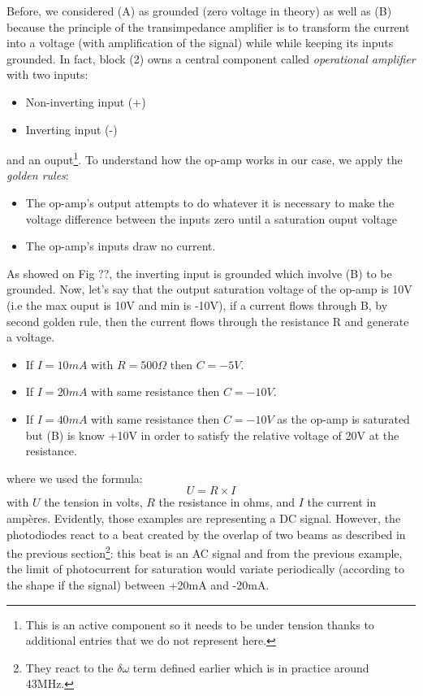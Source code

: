 \documentclass[12pt]{report}
\begin{document}
Before, we considered (A) as grounded (zero voltage in theory) as well as (B) because the principle of the transimpedance amplifier is to transform the current into a voltage (with amplification of the signal) while while keeping its inputs grounded. In fact, block (2) owns a central component called \textit{operational amplifier} with two inputs:
\begin{itemize}
 \item Non-inverting input (+)
 \item Inverting input (-)
\end{itemize}
and an ouput\footnote{This is an active component so it needs to be under tension thanks to additional entries that we do not represent here.}. To understand how the op-amp works in our case, we apply the \textit{golden rules}:
\begin{itemize}
 \item The op-amp's output attempts to do whatever it is necessary to make the voltage difference between the inputs zero until a saturation ouput voltage
 \item The op-amp's inputs draw no current.
\end{itemize} As showed on Fig ??, the inverting input is grounded which involve (B) to be grounded. Now, let's say that the output saturation voltage of the op-amp is 10V (i.e the max ouput is 10V and min is -10V), if a current flows through B, by second golden rule, then the current flows through the resistance R and generate a voltage.
\begin{itemize}
	\item If $I = 10mA$ with $R = 500\Omega$ then $C = -5V$.
	\item If $I = 20mA$ with same resistance then $C = -10V$.
	\item If $I = 40mA$ with same resistance then $C = -10V$ as the op-amp is saturated but (B) is know +10V in order to satisfy the relative voltage of 20V at the resistance.
\end{itemize}
where we used the formula:
\begin{equation}
\label{ueqri}
U = R \times I
\end{equation}
with $U$ the tension in volts, $R$ the resistance in ohms, and $I$ the current in ampères. Evidently, those examples are representing a DC signal. However, the photodiodes react to a beat created by the overlap of two beams as described in the previous section\footnote{They react to the $\delta\omega$ term defined earlier which is in practice around 43MHz.}: this beat is an AC signal and from the previous example, the limit of photocurrent for saturation would variate periodically (according to the shape if the signal) between +20mA and -20mA.
\end{document}
